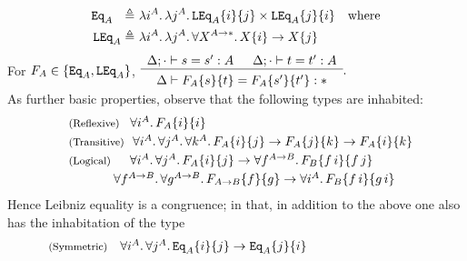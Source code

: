 \begin{align*}
\mathtt{Eq}_A ~~\triangleq&~
	\lambda i^A.\, \lambda j^A.\, 
	\mathtt{LEq}_A\{i\} \{j\} \times \mathtt{LEq}_A\{j\} \{i\}
\quad \text{where} \\
\mathtt{LEq}_A \triangleq&~
	\lambda i^A.\, \lambda j^A.\, \forall X^{A\to*}.\, X\{i\}\to X\{j\}
\end{align*}
For $F_A\in\{\mathtt{Eq}_A,\mathtt{LEq}_A\}$, 
$\begin{array}{c}
\Delta;\cdot\vdash s=s':A\enspace\quad \Delta;\cdot\vdash t=t':A
\\ \hline \\[-3mm]
\Delta\vdash F_A \{s\} \{t\} = F_A\{s'\}\{t'\}:*
\end{array}.$ \vspace*{3pt} \\
As further basic properties, observe that the following types are
inhabited: 
\[\!\!\!\!\begin{array}{l}
\text{\small(Reflexive)} 
~~\,
\forall i^A.\,F_A\s{i}\s{i}
\\[1mm]
\text{\small(Transitive)} 
~~
\forall i^A.\,\forall j^A.\,\forall k^A.\,
  F_A\s{i}\s{j}\to F_A\s{j}\s{k}\to F_A\s{i}\s{k}
\\[1mm]
\text{\small(Logical)}
\quad~\, \forall i^A.\,\forall j^A.\, 
F_A\s{i}\s{j}\to \forall f^{A\to B}.\, F_B\s{f\,i}\s{f\,j}
\\[1mm]
\qquad\qquad~~~
\forall f^{A\to B}.\,\forall g^{A\to B}.\, 
F_{A\to B}\s{f}\s{g}\to 
\forall i^A.\, F_B\s{f\,i}\s{g\,i}
\end{array}\]
Hence Leibniz equality is a congruence; in that, in addition to the above
one also has the inhabitation of the type
\[\!\!\!\!\begin{array}{l}
\text{\small(Symmetric)} 
\quad
\forall i^A.\,\forall j^A.\,
  \Eq_A\s{i}\s{j}\to\Eq_A\s{j}\s{i}
\end{array}\qquad\qquad\qquad\qquad\qquad\]

